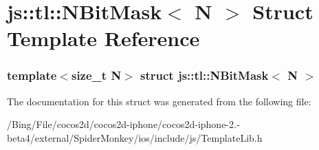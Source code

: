 \hypertarget{structjs_1_1tl_1_1_n_bit_mask}{\section{js\-:\-:tl\-:\-:N\-Bit\-Mask$<$ N $>$ Struct Template Reference}
\label{structjs_1_1tl_1_1_n_bit_mask}
}
\subsubsection*{template$<$size\-\_\-t N$>$ struct js\-::tl\-::\-N\-Bit\-Mask$<$ N $>$}



The documentation for this struct was generated from the following file\-:\begin{DoxyCompactItemize}
\item 
/\-Bing/\-File/cocos2d/cocos2d-\/iphone/cocos2d-\/iphone-\/2.-\/beta4/external/\-Spider\-Monkey/ios/include/js/Template\-Lib.\-h\end{DoxyCompactItemize}

